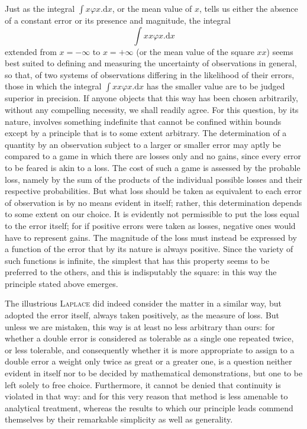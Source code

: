Just as the integral \(\int x\varphi x.\mathrm{d}x\), or the mean value of \(x\), tells us either the absence of a constant error or its presence and magnitude, the integral
\[
\int xx\varphi x.\mathrm{d}x
\]
extended from \(x=-\infty\) to \(x=+\infty\) (or the mean value of the square \(xx\)) seems best suited to defining and measuring the uncertainty of observations in general, so that, of two systems of observations differing in the likelihood of their errors, those in which the integral \(\int xx\varphi x.\mathrm{d}x\) has the smaller value are to be judged superior in precision. If anyone objects that this way has been chosen arbitrarily, without any compelling necessity, we shall readily agree.
For this question, by its nature, involves something indefinite that cannot be confined within bounds except by a principle that is to some extent arbitrary. The determination of a quantity by an observation subject to a larger or smaller error may aptly be compared to a game in which there are losses only and no gains, since every error to be feared is akin to a loss. The cost of such a game is assessed by the probable loss, namely by the sum of the products of the individual possible losses and their respective probabilities. But what loss should be taken as equivalent to each error of observation is by no means evident in itself; rather, this determination depends to some extent on our choice. It is evidently not permissible to put the loss equal to the error itself; for if positive errors were taken as losses, negative ones would have to represent gains. The magnitude of the loss must instead be expressed by a function of the error that by its nature is always positive. Since the variety of such functions is infinite, the simplest that has this property seems to be preferred to the others, and this is indisputably the square: in this way the principle stated above emerges.

The illustrious \textsc{Laplace} did indeed consider the matter in a similar way, but adopted the error itself, always taken positively, as the measure of loss. But unless we are mistaken, this way is at least no less arbitrary than ours: for whether a double error is considered as tolerable as a single one repeated twice, or less tolerable, and consequently whether it is more appropriate to assign to a double error a weight only twice as great or a greater one, is a question neither evident in itself nor to be decided by mathematical demonstrations, but one to be left solely to free choice. Furthermore, it cannot be denied that continuity is violated in that way: and for this very reason that method is less amenable to analytical treatment, whereas the results to which our principle leads commend themselves by their remarkable simplicity as well as generality.

\clearpage
